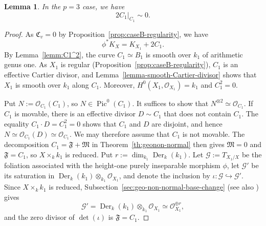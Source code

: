 \documentclass[10pt,abstract=true]{scrartcl}
\numberwithin{equation}{section}
\newtheorem{lemma}[theorem]{Lemma}
\theoremstyle{definition}
\theoremstyle{remark}
\begin{document}
\begin{lemma}\label{lemm:caseB-normal-bundle}%
  In the $p=3$ case, we have
  \[
    2C_1|_{C_1}\sim0.
  \]
\end{lemma}
\begin{proof}
  As $\mathfrak C_v=0$ by Proposition~\ref{prop:caseB-regularity}, we have
  \[
    \phi^*K_X=K_{X_1}+2C_1.
  \]
  By Lemma~\ref{lemm:C1^2}, the curve $C_1\simeq B_1$ is smooth over $k_1$ of arithmetic genus one.
  As $X_1$ is regular (Proposition~\ref{prop:caseB-regularity}), $C_1$ is an effective Cartier divisor, and Lemma~\ref{lemma-smooth-Cartier-divisor} shows that $X_1$ is smooth over $k_1$ along $C_1$.
  Moreover, $H^0(X_1,\mathcal O_{X_1})=k_1$ and $C_1^2=0$. 

  Put $N:=\mathcal O_{C_1}(C_1)$, so $N\in\operatorname{Pic}^0(C_1)$.
  It suffices to show that $N^{\otimes2}\simeq\mathcal O_{C_1}$.
  If $C_1$ is movable, there is an effective divisor $D\sim C_1$ that does not contain $C_1$.
  The equality $C_1\cdot D=C_1^2=0$ shows that $C_1$ and $D$ are disjoint, and hence $N\simeq\mathcal O_{C_1}(D)\simeq\mathcal O_{C_1}$.
  We may therefore assume that $C_1$ is not movable.
  The decomposition $C_1 = \mathfrak F + \mathfrak M$ in Theorem~\ref{th:geonon-normal} then gives $\mathfrak M = 0$ and $\mathfrak F = C_1$, so $X\times_k k_1$ is reduced.
  Put $r := \dim_{k_1}\operatorname{Der}_k(k_1)$.
  Let $\mathscr G:=T_{X_1/X}$ be the foliation associated with the height-one purely inseparable morphism $\phi$, let $\mathscr G'$ be its saturation in $\operatorname{Der}_k(k_1)\otimes_{k_1}\mathcal O_{X_1}$, and denote the inclusion by $\iota\colon\mathscr G\hookrightarrow\mathscr G'$.
  Since $X\times_k k_1$ is reduced, Subsection~\ref{sec:geo-non-normal-base-change} (see also \cite[Remark~3.3]{ji_structure_2021}) gives
  \[
    \mathscr G' = \operatorname{Der}_k(k_1)\otimes_{k_1}\mathcal O_{X_1}
      \simeq\mathcal O_{X_1}^{\oplus r},
  \]
  and the zero divisor of $\det(\iota)$ is $\mathfrak F = C_1$.


\end{proof}
\end{document}
